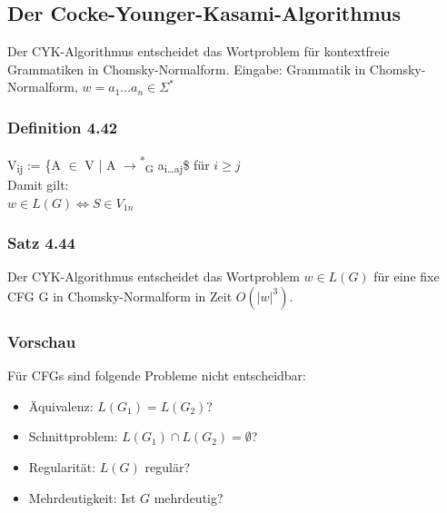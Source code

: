 \documentclass[11pt]{article}
\begin{document}
\subsection{Der Cocke-Younger-Kasami-Algorithmus}
\label{sec:org5cb18ef}
Der CYK-Algorithmus entscheidet das Wortproblem für kontextfreie Grammatiken in Chomsky-Normalform.
Eingabe: Grammatik in Chomsky-Normalform,
\(w = a_1 ... a_n \in \Sigma^*\)
\subsubsection{Definition 4.42}
\label{sec:org427ead6}
V\textsubscript{ij} := \{A \(\in\) V | A \(\rightarrow\)\textsuperscript{*}\textsubscript{G} a\textsubscript{i\ldots{}a}\textsubscript{j}\$ für \(i \geq j\) \\
Damit gilt: \\
\(w \in L(G) \iff S \in V_{1n}\)
\subsubsection{Satz 4.44}
\label{sec:org9c29fa6}
Der CYK-Algorithmus entscheidet das Wortproblem \(w \in L(G)\) für eine fixe CFG G in Chomsky-Normalform in Zeit \(O(|w|^3)\).

\subsubsection{Vorschau}
\label{sec:orga88137d}
Für CFGs sind folgende Probleme nicht entscheidbar:
\begin{itemize}
\item Äquivalenz: \(L(G_1) = L(G_2)\)?
\item Schnittproblem: \(L(G_1) \cap L(G_2) = \emptyset\)?
\item Regularität: \(L(G)\) regulär?
\item Mehrdeutigkeit: Ist \(G\) mehrdeutig?
\end{itemize}
\end{document}
